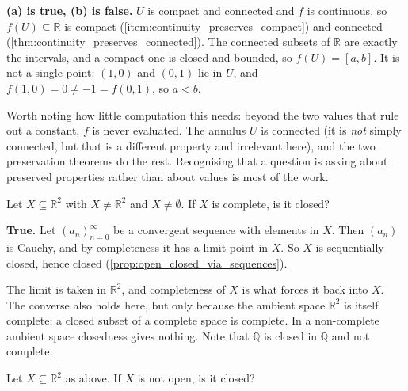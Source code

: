 \begin{answer}
\textbf{(a) is true, (b) is false.} $U$ is compact and connected and $f$ is continuous, so
$f(U) \subseteq \mathbb{R}$ is compact (\cref{item:continuity_preserves_compact}) and connected
(\cref{thm:continuity_preserves_connected}). The connected subsets of $\mathbb{R}$ are exactly
the intervals, and a compact one is closed and bounded, so $f(U) = [a,b]$.
It is not a single point: $(1,0)$ and $(0,1)$ lie in $U$, and $f(1,0) = 0 \neq -1 = f(0,1)$, so
$a < b$.
\end{answer}

\begin{ainote}
Worth noting how little computation this needs: beyond the two values that rule out a constant,
$f$ is never evaluated. The annulus $U$ is
connected (it is \emph{not} simply connected, but that is a different property and irrelevant
here), and the two preservation theorems do the rest. Recognising that a question
is asking about preserved properties rather than about values is most of the work.
\end{ainote}

\begin{question}
\label{q:quiz_q2}
Let $X \subseteq \mathbb{R}^2$ with $X \neq \mathbb{R}^2$ and $X \neq \emptyset$. If $X$ is
complete, is it closed?
\end{question}

\begin{answer}
\textbf{True.} Let $(a_n)_{n=0}^\infty$ be a convergent sequence with elements in $X$. Then
$(a_n)$ is Cauchy, and by completeness it has a limit point in $X$. So $X$ is sequentially
closed, hence closed (\cref{prop:open_closed_via_sequences}).
\end{answer}

\begin{ainote}
The limit is taken in $\mathbb{R}^2$, and completeness of $X$ is what forces it back into $X$.
The converse also holds here, but only because the ambient space $\mathbb{R}^2$ is itself
complete: a closed subset of a complete space is complete. In a non-complete ambient space
closedness gives nothing. Note that $\mathbb{Q}$ is closed in $\mathbb{Q}$ and not complete.
\end{ainote}

\begin{question}
\label{q:quiz_q3}
Let $X \subseteq \mathbb{R}^2$ as above. If $X$ is not open, is it closed?
\end{question}

